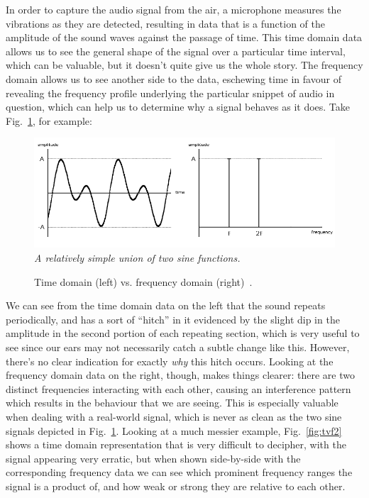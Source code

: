 \documentclass[12pt]{report}
\begin{document}
\indent In order to capture the audio signal from the air, a microphone measures the vibrations as they are detected, resulting in data that is a function of the amplitude of the sound waves against the passage of time. This time domain data allows us to see the general shape of the signal over a particular time interval, which can be valuable, but it doesn't quite give us the whole story. The frequency domain allows us to see another side to the data, eschewing time in favour of revealing the frequency profile underlying the particular snippet of audio in question, which can help us to determine why a signal behaves as it does. Take Fig.~\ref{fig:tvf1}, for example:

\begin{figure}[h]
	\centering
	\includegraphics[width=120mm]{timevfreq-02.jpg}
	\\ \emph{A relatively simple union of two sine functions.}
	\caption[Time vs. Frequency: Clean]{Time domain (left) vs. frequency domain (right)~\cite{Anon2014b}.} 
	\label{fig:tvf1} 
\end{figure}	

\indent We can see from the time domain data on the left that the sound repeats periodically, and has a sort of ``hitch'' in it evidenced by the slight dip in the amplitude in the second portion of each repeating section, which is very useful to see since our ears may not necessarily catch a subtle change like this. However, there's no clear indication for exactly \emph{why} this hitch occurs. Looking at the frequency domain data on the right, though, makes things clearer: there are two distinct frequencies interacting with each other, causing an interference pattern which results in the behaviour that we are seeing. This is especially valuable when dealing with a real-world signal, which is never as clean as the two sine signals depicted in Fig.~\ref{fig:tvf1}. Looking at a much messier example, Fig.~\ref{fig:tvf2} shows a time domain representation that is very difficult to decipher, with the signal appearing very erratic, but when shown side-by-side with the corresponding frequency data we can see which prominent frequency ranges the signal is a product of, and how weak or strong they are relative to each other. 
\end{document}

